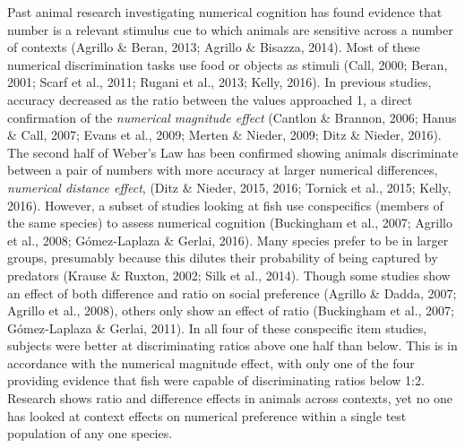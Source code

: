 \documentclass[
  english,
  ,doc,floatsintext]{apa6}
\begin{document}
Past animal research investigating numerical cognition has found evidence that number is a relevant stimulus cue to which animals are sensitive across a number of contexts (Agrillo \& Beran, 2013; Agrillo \& Bisazza, 2014). Most of these numerical discrimination tasks use food or objects as stimuli (Call, 2000; Beran, 2001; Scarf et al., 2011; Rugani et al., 2013; Kelly, 2016). In previous studies, accuracy decreased as the ratio between the values approached 1, a direct confirmation of the \emph{numerical magnitude effect} (Cantlon \& Brannon, 2006; Hanus \& Call, 2007; Evans et al., 2009; Merten \& Nieder, 2009; Ditz \& Nieder, 2016). The second half of Weber's Law has been confirmed showing animals discriminate between a pair of numbers with more accuracy at larger numerical differences, \emph{numerical distance effect}, (Ditz \& Nieder, 2015, 2016; Tornick et al., 2015; Kelly, 2016). However, a subset of studies looking at fish use conspecifics (members of the same species) to assess numerical cognition (Buckingham et al., 2007; Agrillo et al., 2008; Gómez-Laplaza \& Gerlai, 2016). Many species prefer to be in larger groups, presumably because this dilutes their probability of being captured by predators (Krause \& Ruxton, 2002; Silk et al., 2014). Though some studies show an effect of both difference and ratio on social preference (Agrillo \& Dadda, 2007; Agrillo et al., 2008), others only show an effect of ratio (Buckingham et al., 2007; Gómez-Laplaza \& Gerlai, 2011). In all four of these conspecific item studies, subjects were better at discriminating ratios above one half than below. This is in accordance with the numerical magnitude effect, with only one of the four providing evidence that fish were capable of discriminating ratios below 1:2. Research shows ratio and difference effects in animals across contexts, yet no one has looked at context effects on numerical preference within a single test population of any one species.
\end{document}
